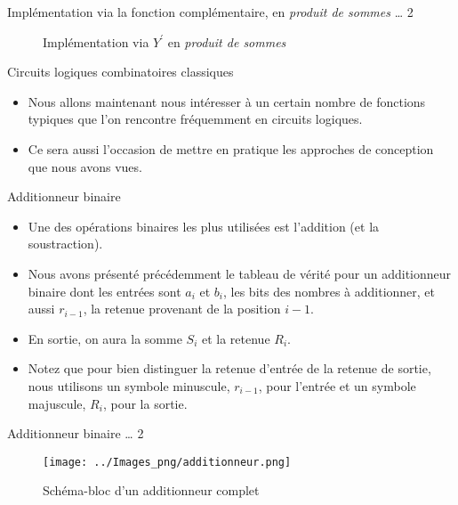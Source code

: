 \documentclass[presentation]{beamer}
\begin{document}
\begin{frame}[label={sec:org5dfb454}]{Implémentation via la fonction complémentaire, en \emph{produit de sommes} \ldots{} 2}
\begin{figure}[htbp]
\centering

\caption{\label{fig:orgfa87bb9}Implémentation via \(Y^\prime\) en \emph{produit de sommes}}
\end{figure} 
\end{frame}

\begin{frame}[label={sec:org86d6525}]{Circuits logiques combinatoires classiques}
\begin{itemize}
\item Nous allons maintenant nous intéresser à un certain nombre de fonctions typiques que l'on rencontre fréquemment en circuits logiques.

\item Ce sera aussi l'occasion de mettre en pratique les approches de conception que nous avons vues.
\end{itemize}
\end{frame}


\begin{frame}[label={sec:orgab14752}]{Additionneur binaire}
\begin{itemize}
\item Une des opérations binaires les plus utilisées est l'addition (et la soustraction).

\item Nous avons présenté précédemment le tableau de vérité pour un additionneur binaire dont les entrées sont \(a_{i}\) et \(b_{i}\), les bits des nombres à additionner, et aussi \(r_{i-1}\), la retenue provenant de la position \(i-1\).

\item En sortie, on aura la somme \(S_{i}\) et la retenue \(R_{i}\).

\item Notez que pour bien distinguer la retenue d'entrée de la retenue de sortie, nous utilisons un symbole minuscule, \(r_{i-1}\), pour l'entrée et un symbole majuscule, \(R_{i}\), pour la sortie.
\end{itemize}
\end{frame}

\begin{frame}[label={sec:org15c211a}]{Additionneur binaire \ldots{} 2}
\begin{figure}[htbp]
\centering
\texttt{[image: ../Images\_png/additionneur.png]}
\caption{\label{fig:org2df799d}Schéma-bloc d'un additionneur complet}
\end{figure}
\end{frame}
\end{document}
